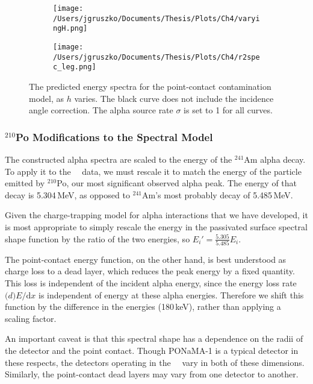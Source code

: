 \begin{figure}[t]
 \centering
 \begin{subfigure}[]{.7\textwidth}
 \texttt{[image: /Users/jgruszko/Documents/Thesis/Plots/Ch4/varyingH.png]}
 \end{subfigure}
  \begin{subfigure}[]{.25\textwidth}
 \texttt{[image: /Users/jgruszko/Documents/Thesis/Plots/Ch4/r2spec\_leg.png]}
 \end{subfigure}
 \caption[The predicted energy spectra for the point-contact contamination model, as $h$ varies]{The predicted energy spectra for the point-contact contamination model, as $h$ varies. The black curve does not include the incidence angle correction. The alpha source rate $\sigma$ is set to 1 for all curves.} 
 \label{fig:spec_shape}
\end{figure}

\subsubsection{$^{210}$Po Modifications to the Spectral Model}
The constructed alpha spectra are scaled to the energy of the $^{241}$Am alpha decay. To apply it to the \MJ\ \DEM\ data, we must rescale it to match the energy of the particle emitted by $^{210}$Po, our most significant observed alpha peak. The energy of that decay is 5.304\,MeV, as opposed to $^{241}$Am's most probably decay of 5.485\,MeV. 

Given the charge-trapping model for alpha interactions that we have developed, it is most appropriate to simply rescale the energy in the passivated surface spectral shape function by the ratio of the two energies, so $E_i' = \frac{5.305}{5.485}E_i$.

The point-contact energy function, on the other hand, is best understood as charge loss to a dead layer, which reduces the peak energy by a fixed quantity. This loss is independent of the incident alpha energy, since the energy loss rate $\mathrm(d)E/\mathrm{d}x$ is independent of energy at these alpha energies. Therefore we shift this function by the difference in the energies (180\,keV), rather than applying a scaling factor. 

An important caveat is that this spectral shape has a dependence on the radii of the detector and the point contact. Though PONaMA-1 is a typical detector in these respects, the detectors operating in the \MJ\ \DEM\ vary in both of these dimensions. Similarly, the point-contact dead layers may vary from one detector to another. 

